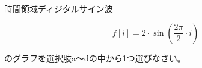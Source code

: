 時間領域ディジタルサイン波 

\[
f[i] = 2 \cdot \sin \left ( \frac{2 \pi}{2}  \cdot i \right )
\]

\noindent のグラフを選択肢a〜dの中から1つ選びなさい。
